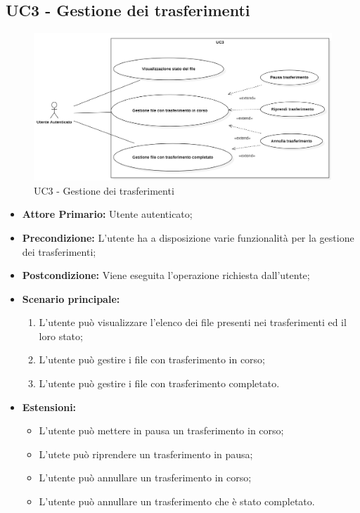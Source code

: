\subsection{UC3 - Gestione dei trasferimenti}
\begin{figure}[H]
    \centering
    \includegraphics[scale = 0.4]{components/img/UC3.png}
    \caption{UC3 - Gestione dei trasferimenti}
\end{figure}
\begin{itemize}
\item \textbf{Attore Primario:} Utente autenticato;
\item \textbf{Precondizione:} L'utente ha a disposizione varie funzionalità per la gestione dei trasferimenti;
\item \textbf{Postcondizione:} Viene eseguita l'operazione richiesta dall'utente;
\item \textbf{Scenario principale:}
    \begin{enumerate}
    \item L'utente può visualizzare l'elenco dei file presenti nei trasferimenti ed il loro stato;
    \item L'utente può gestire i file con trasferimento in corso;
    \item L'utente può gestire i file con trasferimento completato.
    \end{enumerate}
\item \textbf{Estensioni:}
\begin{itemize}
\item L'utente può mettere in pausa un trasferimento in corso;
\item L'utete può riprendere un trasferimento in pausa;
\item L'utente può annullare un trasferimento in corso;
\item L'utente può annullare un trasferimento che è stato completato.
\end{itemize}
\end{itemize}